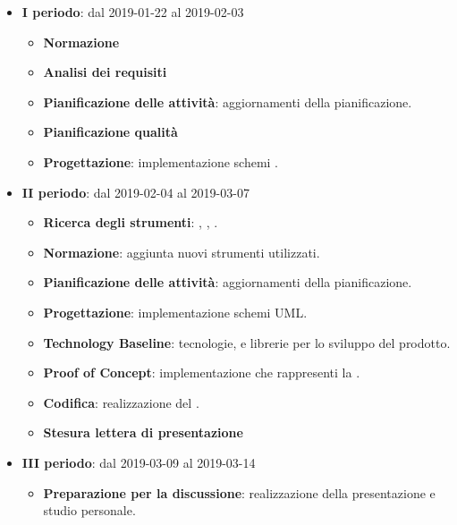 		\begin{itemize}
			\item \textbf{I periodo}: dal 2019-01-22 al 2019-02-03
			\begin{itemize}
    	        \item \textbf{Normazione}
    	        \item \textbf{Analisi dei requisiti}
    	        \item \textbf{Pianificazione delle attività}: aggiornamenti della pianificazione.
    	        \item \textbf{Pianificazione qualità}
    	        \item \textbf{Progettazione}: implementazione schemi .
        	\end{itemize}
			\item \textbf{II periodo}: dal 2019-02-04 al 2019-03-07
			\begin{itemize}
				\item \textbf{Ricerca degli strumenti}: , , .
    	        \item \textbf{Normazione}: aggiunta nuovi strumenti utilizzati.
    	        \item \textbf{Pianificazione delle attività}: aggiornamenti della pianificazione.
    	        \item \textbf{Progettazione}: implementazione schemi UML.
    	        \item \textbf{Technology Baseline}: tecnologie,  e librerie per lo sviluppo del prodotto.
    	        \item \textbf{Proof of Concept}: implementazione che rappresenti la .
    	        \item \textbf{Codifica}: realizzazione del .
    	        \item \textbf{Stesura lettera di presentazione}
        	\end{itemize}
        	\item \textbf{III periodo}: dal 2019-03-09 al 2019-03-14
			\begin{itemize}
				\item \textbf{Preparazione per la discussione}: realizzazione della presentazione e studio personale.
        	\end{itemize}
		\end{itemize}

